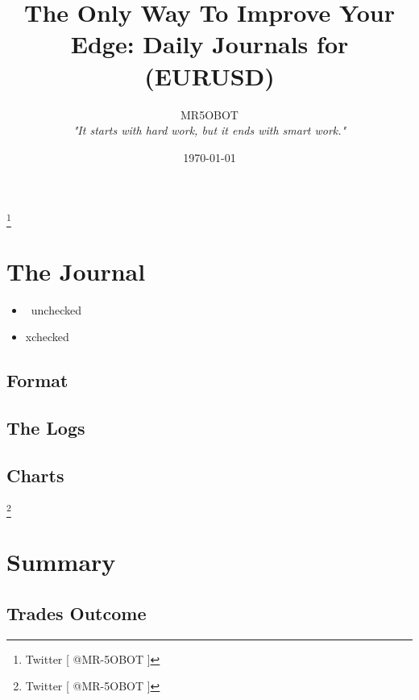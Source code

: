 \documentclass{article}
\title{The Only Way To Improve Your Edge: Daily Journals for (EURUSD)}
\author{MR5OBOT \\ \textit{"It starts with hard work, but it ends with smart work."}}
\date{\today}
\begin{document}
\maketitle
\pagestyle{fancy}
\tableofcontents

\footnote{Twitter [ @MR-5OBOT ]}
\newpage

\section{The Journal} 

\begin{itemize}[label={}]
    \item \lbrack\ \rbrack unchecked
    \item \lbrack x\rbrack checked
\end{itemize}
\subsection{Format}
\subsection{The Logs}

\subsection{Charts}

\newpage
\footnote{Twitter [ @MR-5OBOT ]}

\section{Summary}
\subsection{Trades Outcome}

\end{document}
